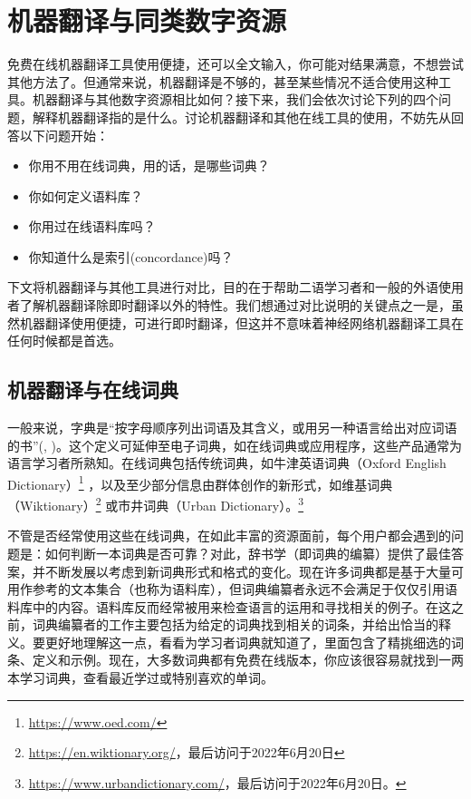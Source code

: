 \documentclass[output=paper,colorlinks,citecolor=brown]{langscibook}
\begin{document}
\section{机器翻译与同类数字资源}
免费在线机器翻译工具使用便捷，还可以全文输入，你可能对结果满意，不想尝试其他方法了。但通常来说，机器翻译是不够的，甚至某些情况不适合使用这种工具。机器翻译与其他数字资源相比如何？接下来，我们会依次讨论下列的四个问题，解释机器翻译指的是什么。讨论机器翻译和其他在线工具的使用，不妨先从回答以下问题开始：

\begin{itemize}
\item 你用不用在线词典，用的话，是哪些词典？
\item 你如何定义语料库？
\item 你用过在线语料库吗？
\item 你知道什么是索引(concordance)吗？
\end{itemize}

下文将机器翻译与其他工具进行对比，目的在于帮助二语学习者和一般的外语使用者了解机器翻译除即时翻译以外的特性。我们想通过对比说明的关键点之一是，虽然机器翻译使用便捷，可进行即时翻译，但这并不意味着神经网络机器翻译工具在任何时候都是首选。


\subsection{机器翻译与在线词典}
一般来说，字典是“按字母顺序列出词语及其含义，或用另一种语言给出对应词语的书”(, \citeyear{Cambridge2020})。这个定义可延伸至电子词典，如在线词典或应用程序，这些产品通常为语言学习者所熟知。在线词典包括传统词典，如牛津英语词典（Oxford English Dictionary）\footnote{\url{https://www.oed.com/}} ，以及至少部分信息由群体创作的新形式，如维基词典（Wiktionary）\footnote{\url{https://en.wiktionary.org/}，最后访问于2022年6月20日} 或市井词典（Urban Dictionary）。\footnote{\url{https://www.urbandictionary.com/}，最后访问于2022年6月20日。}

不管是否经常使用这些在线词典，在如此丰富的资源面前，每个用户都会遇到的问题是：如何判断一本词典是否可靠？对此，辞书学（即词典的编纂）提供了最佳答案，并不断发展以考虑到新词典形式和格式的变化。现在许多词典都是基于大量可用作参考的文本集合（也称为语料库），但词典编纂者永远不会满足于仅仅引用语料库中的内容。语料库反而经常被用来检查语言的运用和寻找相关的例子。在这之前，词典编纂者的工作主要包括为给定的词典找到相关的词条，并给出恰当的释义。要更好地理解这一点，看看为学习者词典就知道了，里面包含了精挑细选的词条、定义和示例。现在，大多数词典都有免费在线版本，你应该很容易就找到一两本学习词典，查看最近学过或特别喜欢的单词。
\end{document}
